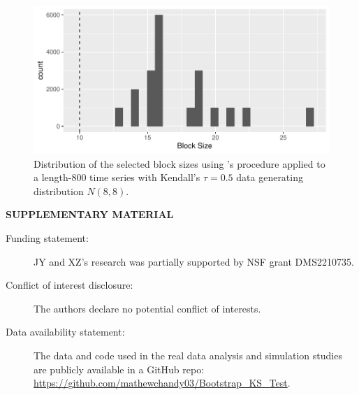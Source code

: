 \documentclass[12pt]{article}
\begin{document}
\begin{figure}[tbp]
  \centering
  \includegraphics[scale=1]{figures/block_dist}
  \caption{Distribution of the selected block sizes using
  \citet{politis2004automatic}'s procedure applied to a length-800 time series with
    Kendall's $\tau = 0.5$ data generating distribution $N(8,8)$.
  }
  \label{fig:block_dist}
\end{figure}

\bigskip
\begin{center}
{\large\bf SUPPLEMENTARY MATERIAL}
\end{center}

\begin{description}

\item[Funding statement:]JY and XZ's research was partially supported by NSF grant
DMS2210735.

\item[Conflict of interest disclosure:]The authors declare no potential conflict
of interests.

\item[Data availability statement:] The data and code used in the real data analysis and simulation
studies are publicly available in a GitHub repo:
\url{https://github.com/mathewchandy03/Bootstrap_KS_Test}.

\end{description}



\end{document}
